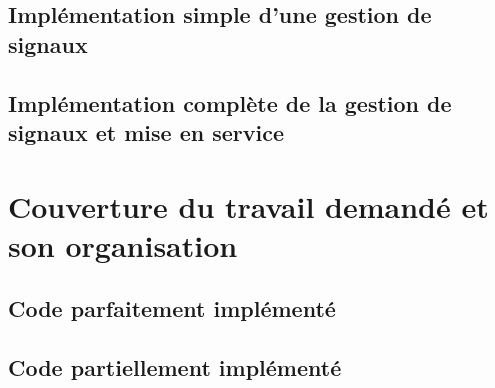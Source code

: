 \documentclass{report}
\begin{document}
\section{Implémentation simple d'une gestion de signaux}

\section{Implémentation complète de la gestion de signaux et mise en service}

\chapter{Couverture du travail demandé et son organisation}
\setcounter{section}{0}
\section{Code parfaitement implémenté}

\section{Code partiellement implémenté}
\end{document}
